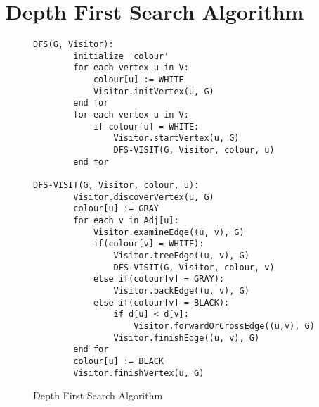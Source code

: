 \documentclass{article}
\begin{document}
\newpage
\appendix

\section{Depth First Search Algorithm}
\begin{figure}[h]
    \begin{lstlisting}
DFS(G, Visitor):
        initialize 'colour'
        for each vertex u in V:
            colour[u] := WHITE
            Visitor.initVertex(u, G)
        end for
        for each vertex u in V:
            if colour[u] = WHITE:
                Visitor.startVertex(u, G)
                DFS-VISIT(G, Visitor, colour, u)
        end for

DFS-VISIT(G, Visitor, colour, u):
        Visitor.discoverVertex(u, G)
        colour[u] := GRAY
        for each v in Adj[u]:
            Visitor.examineEdge((u, v), G)
            if(colour[v] = WHITE):
                Visitor.treeEdge((u, v), G)
                DFS-VISIT(G, Visitor, colour, v)
            else if(colour[v] = GRAY):
                Visitor.backEdge((u, v), G)
            else if(colour[v] = BLACK):
                if d[u] < d[v]:
                    Visitor.forwardOrCrossEdge((u,v), G)
                Visitor.finishEdge((u, v), G)
        end for
        colour[u] := BLACK
        Visitor.finishVertex(u, G)
    \end{lstlisting}
    \label{dfs}
    \caption{Depth First Search Algorithm}
\end{figure}
\end{document}
